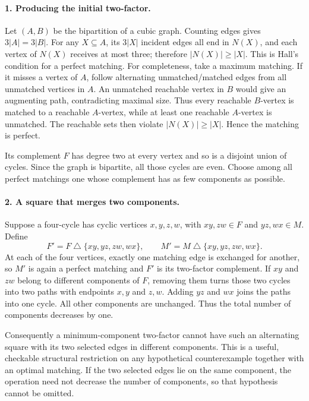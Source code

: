 \documentclass[11pt,a4paper]{article}
\begin{document}
\paragraph{1. Producing the initial two-factor.}
Let $(A,B)$ be the bipartition of a cubic graph. Counting edges gives
$3|A|=3|B|$. For any $X\subseteq A$, its $3|X|$ incident edges all
end in $N(X)$, and each vertex of $N(X)$ receives at most three;
therefore $|N(X)|\ge|X|$. This is Hall's condition for a perfect
matching. For completeness, take a maximum matching. If it misses a
vertex of $A$, follow alternating unmatched/matched edges from all
unmatched vertices in $A$. An unmatched reachable vertex in $B$
would give an augmenting path, contradicting maximal size. Thus every
reachable $B$-vertex is matched to a reachable $A$-vertex, while at
least one reachable $A$-vertex is unmatched. The reachable sets then
violate $|N(X)|\ge|X|$. Hence the matching is perfect.

Its complement $F$ has degree two at every vertex and so is a
disjoint union of cycles. Since the graph is bipartite, all those
cycles are even. Choose among all perfect matchings one whose
complement has as few components as possible.

\paragraph{2. A square that merges two components.}
Suppose a four-cycle has cyclic vertices $x,y,z,w$, with $xy,zw\in F$
and $yz,wx\in M$. Define
\[
 F'=F\mathbin{\triangle}\{xy,yz,zw,wx\},\qquad
 M'=M\mathbin{\triangle}\{xy,yz,zw,wx\}.
\]
At each of the four vertices, exactly one matching edge is exchanged
for another, so $M'$ is again a perfect matching and $F'$ is its
two-factor complement. If $xy$ and $zw$ belong to different components
of $F$, removing them turns those two cycles into two paths with
endpoints $x,y$ and $z,w$. Adding $yz$ and $wx$ joins the paths
into one cycle. All other components are unchanged. Thus the total
number of components decreases by one.

Consequently a minimum-component two-factor cannot have such an
alternating square with its two selected edges in different components.
This is a useful, checkable structural restriction on any hypothetical
counterexample together with an optimal matching. If the two selected
edges lie on the same component, the operation need not decrease the
number of components, so that hypothesis cannot be omitted.
\end{document}
